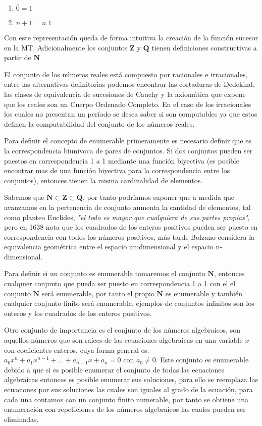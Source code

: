 \documentclass[]{article}
\begin{document}
\begin{enumerate}
	\item $\overline{0} = 1$
	\item $\overline{n + 1} = \overline{n}\;1$
\end{enumerate}

Con este representaci\'on queda de forma intuitiva la creaci\'on de la funci\'on sucesor en la MT. Adicionalmente los conjuntos $\textbf{Z}$ y $\textbf{Q}$ tienen definiciones constructivas a partir de $\textbf{N}$ 

El conjunto de los n\'umeros reales est\'a compuesto por racionales e irracionales, entre las alternativas definitorias podemos encontrar las cortaduras de Dedekind, las clases de equivalencia de sucesiones de Cauchy y la axiom\'atica que expone que los reales son un Cuerpo Ordenado Completo. En el caso de los irracionales los cuales no presentan un per\'iodo se desea saber si son computables ya que estos definen la computabilidad del conjunto de los n\'umeros reales.

Para definir el concepto de enumerable primeramente es necesario definir que es la correspondencia biun\'ivoca de pares de conjuntos. Si dos conjuntos pueden ser puestos en correspondencia 1 a 1 mediante una funci\'on biyectiva (es posible encontrar mas de una funci\'on biyectiva para la correspondencia entre los conjuntos), entonces tienen la misma cardinalidad de elementos.

Sabemos que $\textbf{N} \subset \textbf{Z} \subset \textbf{Q}$, por tanto podr\'iamos suponer que a medida que avanzamos en la pertenencia de conjunto aumenta la cantidad de elementos, tal como planteo Euclides, \textit{"el todo es mayor que cualquiera de sus partes propias"}, pero en 1638 nota que los cuadrados de los enteros positivos pueden ser puesto en correspondencia con todos los n\'umeros positivos, m\'as tarde Bolzano considera la equivalencia geom\'etrica entre el espacio unidimensional y el espacio n-dimensional.

Para definir si un conjunto es enumerable tomaremos el conjunto $\textbf{N}$, entonces cualquier conjunto que pueda ser puesto en correspondencia 1 a 1 con el el conjunto $\textbf{N}$ ser\'a enumerable, por tanto el propio $\textbf{N}$ es enumerable y tambi\'en cualquier conjunto finito ser\'a enumerable, ejemplos de conjuntos infinitos son los enteros y los cuadrados de los enteros positivos.

Otro conjunto de importancia es el conjunto de los n\'umeros algebraicos, son aquellos n\'umeros que son ra\'ices de las ecuaciones algebraicas en una variable $x$ con coeficientes enteros, cuya forma general es: $a_0x^n + a_1x^{n-1} + ... + a_{n-1}x + a_n = 0$ con $a_0 \neq 0$. Este conjunto es enumerable debido a que si es posible enumerar el conjunto de todas las ecuaciones algebraicas entonces es posible enumerar sus soluciones, para ello se reemplaza las ecuaciones por sus soluciones las cuales son iguales al grado de la ecuaci\'on, para cada una contamos con un conjunto finito numerable, por tanto se obtiene una enumeraci\'on con repeticiones de los n\'umeros algebraicos las cuales pueden ser eliminadas.
\end{document}
